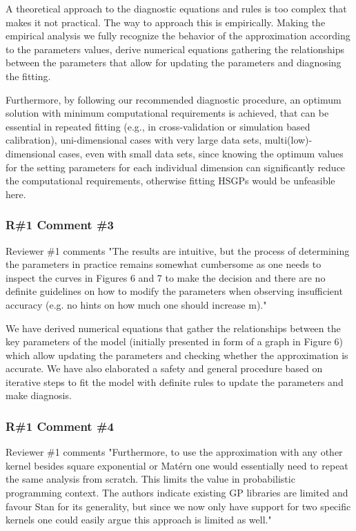 \documentclass[11pt]{report}
\begin{document}
A theoretical approach to the diagnostic equations and rules is too complex that makes it not practical. The way to approach this is empirically. Making the empirical analysis we fully recognize the behavior of the approximation according to the parameters values, derive numerical equations gathering the relationships between the parameters that allow for updating the parameters and diagnosing the fitting.

Furthermore, by following our recommended diagnostic procedure, an optimum solution with minimum computational requirements is achieved, that can be essential in repeated fitting (e.g., in cross-validation or simulation based calibration), uni-dimensional cases with very large data sets, multi(low)-dimensional cases, even with small data sets, since knowing the optimum values for the setting parameters for each individual dimension can significantly reduce the computational requirements, otherwise fitting HSGPs would be unfeasible here.

\subsubsection*{R\#1 Comment \#3}

Reviewer \#1 comments "The results are intuitive, but the process of determining the parameters in practice remains somewhat cumbersome as one needs to inspect the curves in Figures 6 and 7 to make the decision and there are no definite guidelines on how to modify the parameters when observing insufficient accuracy (e.g. no hints on how much one should increase m)."

We have derived numerical equations that gather the relationships between the key parameters of the model (initially presented in form of a graph in Figure 6) which allow updating the parameters and checking whether the approximation is accurate. We have also elaborated a safety and general procedure based on iterative steps to fit the model with definite rules to update the parameters and make diagnosis.

\subsubsection*{R\#1 Comment \#4}

Reviewer \#1 comments "Furthermore, to use the approximation with any other kernel besides square exponential or Matérn one would essentially need to repeat the same analysis from scratch. This limits the value in probabilistic programming context. The authors indicate existing GP  libraries are limited and favour Stan for its generality, but since we now only have support for two specific kernels one could easily argue this approach is limited as well."
\end{document}
